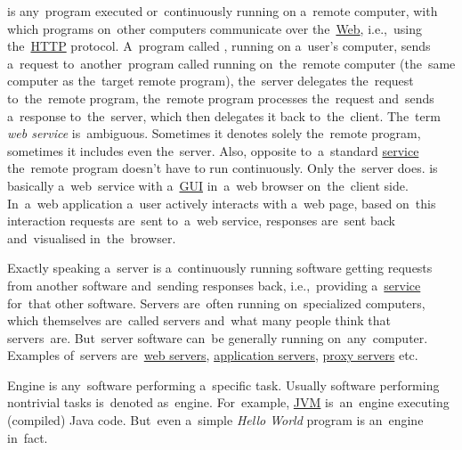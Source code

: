 \label{webserviceapplication}
\begin{itemize}
     is any~program executed or~continuously running on a~remote computer, with which programs on~other computers communicate over the~\hyperref[internetweb]{Web}, i.e.,~using the~\hyperref[http]{HTTP} protocol.
            A~program called \hyperref[clientserverarchitecture]{}, running on a~user's computer, sends a~request to~another~program called \hyperref[clientserverarchitecture]{} running on~the~remote computer (the~same computer as the~target remote program), the~server delegates the~request to~the~remote program, the~remote program processes the~request and~sends a~response to~the~server, which then delegates it back to~the~client.
            \warningnonl The~term \textit{web service} is~ambiguous.
            Sometimes it denotes solely the~remote program, sometimes it includes even the~server.
            Also, opposite to~a~standard \hyperref[applicationprocessprogramservicethread]{service} the~remote program doesn't have to run continuously.
            Only the~server does.
     is basically a~web~service with a~\hyperref[shellcligui]{GUI} in~a~web browser on~the~client side.
            In~a~web application a~user actively interacts with a~web page, based on~this interaction requests are~sent to~a~web service, responses are~sent back and~visualised in~the~browser.
\end{itemize}
\newpage

\label{server}
Exactly speaking a~server is a~continuously running software getting requests from another software and~sending responses back, i.e.,~providing a~\hyperref[applicationprocessprogramservicethread]{service} for~that other software.
Servers are~often running on~specialized computers, which themselves are~called servers and~what many people think that servers~are.
But~server software can~be generally running on~any~computer.
Examples of~servers are~\hyperref[webserver]{web servers}, \hyperref[applicationserver]{application servers}, \hyperref[proxy]{proxy servers} etc.

\label{engine}
Engine is any~software performing a~specific task.
Usually software performing nontrivial tasks is~denoted as~engine.
For~example, \hyperref[jdkjrejvm]{JVM} is~an~engine executing (compiled) Java code.
But~even a~simple \textit{Hello World} program is an~engine in~fact.

